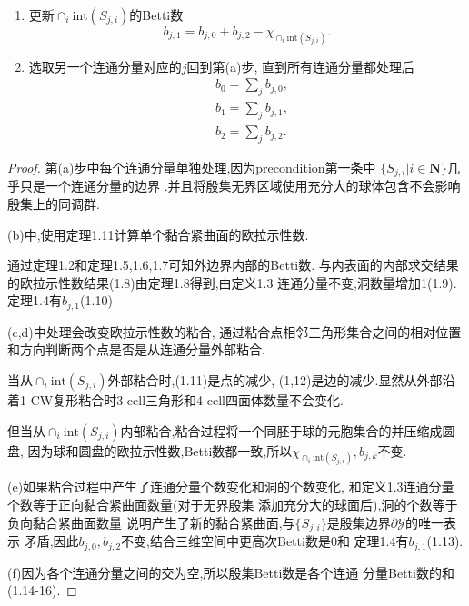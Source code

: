 \documentclass[a4paper]{book}
\numberwithin{equation}{chapter}
\theoremstyle{definition}
\begin{document}
\begin{enumerate}[a]
    \item 更新$\cap_i \text{int}(S_{j,i})$的Betti数
    \begin{equation}
        b_{j,1} = b_{j,0} + b_{j,2} -\chi_{\cap_i \text{int}(S_{j,i})}.
    \end{equation}
    
    \item 选取另一个连通分量对应的$j$回到第(a)步, 直到所有连通分量都处理后
    \begin{align}
        &b_{0} = \sum_j b_{j,0}, \\
        &b_{1} = \sum_j b_{j,1}, \\
        &b_{2} = \sum_j b_{j,2}.
    \end{align}
\end{enumerate}

\begin{proof}
    第(a)步中每个连通分量单独处理,因为precondition第一条中
    $\{{S_{j,i}} | i \in \mathbf{N}\}$几乎只是一个连通分量的边界
    .并且将殷集无界区域使用充分大的球体包含不会影响
    殷集上的同调群.
    
    (b)中,使用定理1.11计算单个黏合紧曲面的欧拉示性数.

    通过定理1.2和定理1.5,1.6,1.7可知外边界内部的Betti数.
    与内表面的内部求交结果的欧拉示性数结果(1.8)由定理1.8得到,由定义1.3
    连通分量不变,洞数量增加1(1.9).定理1.4有$b_{j,1}$(1.10)
    
    (c,d)中处理会改变欧拉示性数的粘合,
    通过粘合点相邻三角形集合之间的相对位置和方向判断两个点是否是从连通分量外部粘合.

    当从$\cap_i \text{int}(S_{j,i})$外部粘合时,(1.11)是点的减少,
    (1,12)是边的减少.显然从外部沿着1-CW复形粘合时3-cell三角形和4-cell四面体数量不会变化.
    
    但当从$\cap_i \text{int}(S_{j,i})$内部粘合,粘合过程将一个同胚于球的元胞集合的并压缩成圆盘,
    因为球和圆盘的欧拉示性数,Betti数都一致,所以$\chi_{\cap_i \text{int}(S_{j,i})},b_{j,k}$不变.

    (e)如果粘合过程中产生了连通分量个数变化和洞的个数变化,
    和定义1.3连通分量个数等于正向黏合紧曲面数量(对于无界殷集
    添加充分大的球面后),洞的个数等于负向黏合紧曲面数量
    说明产生了新的黏合紧曲面,与$\{S_{j,i}\}$是殷集边界$\partial \mathcal{Y}$的唯一表示
    矛盾,因此$b_{j,0}, b_{j,2}$不变,结合三维空间中更高次Betti数是0和
    定理1.4有$b_{j,1}$(1.13).
    
    (f)因为各个连通分量之间的交为空,所以殷集Betti数是各个连通
    分量Betti数的和(1.14-16).
\end{proof}
\end{document}
